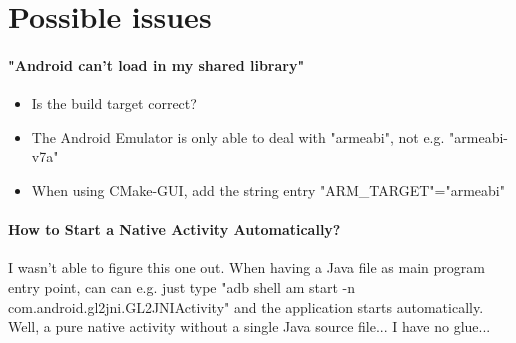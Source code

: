 \section{Possible issues}


\paragraph{"Android can't load in my shared library"}
\begin{itemize}
\item{Is the build target correct?}
\item{The Android Emulator is only able to deal with "armeabi", not e.g. "armeabi-v7a"}
\item{\textrightarrow{} When using CMake-\ac{GUI}, add the string entry "ARM\_TARGET"="armeabi"}
\end{itemize}


\paragraph{How to Start a Native Activity Automatically?}
I wasn't able to figure this one out. When having a Java file as main program entry point, can can e.g. just type "adb shell am start -n com.android.gl2jni.GL2JNIActivity" and the application starts automatically. Well, a pure native activity without a single Java source file... I have no glue...

